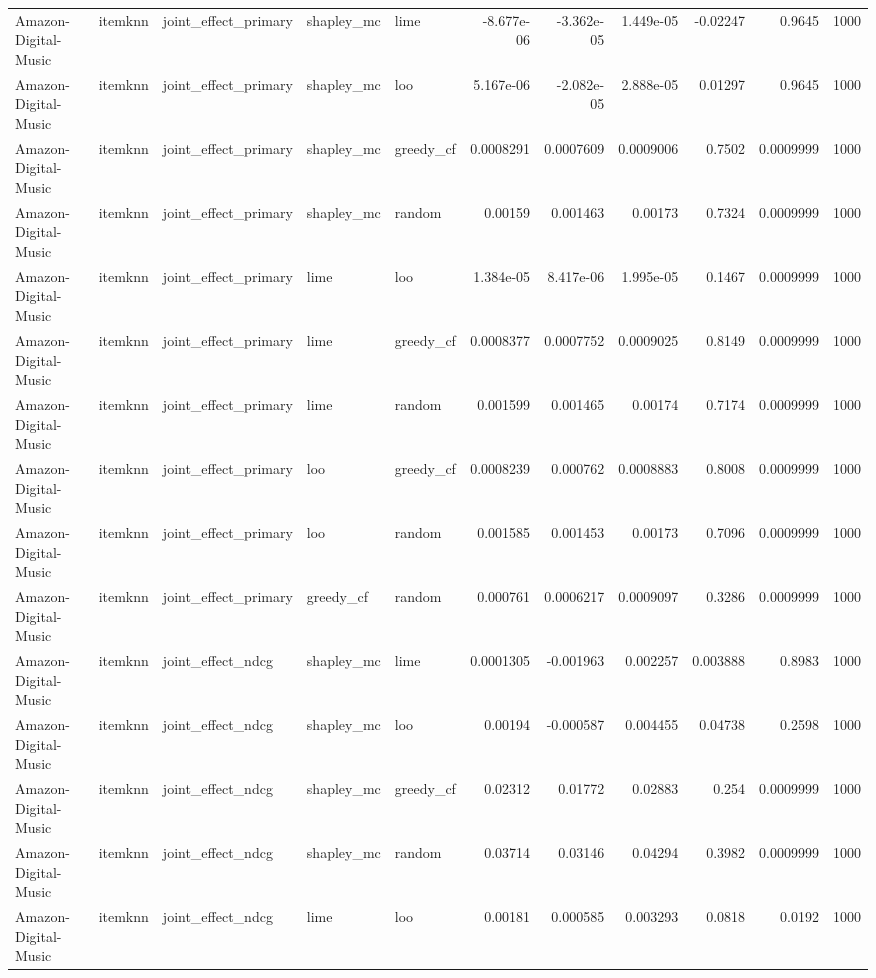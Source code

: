 \begin{table}[t]
\begin{tabular}{lllllrrrrrr}
Amazon-Digital-Music & itemknn & joint\_effect\_primary & shapley\_mc & lime & -8.677e-06 & -3.362e-05 & 1.449e-05 & -0.02247 & 0.9645 & 1000 \\
Amazon-Digital-Music & itemknn & joint\_effect\_primary & shapley\_mc & loo & 5.167e-06 & -2.082e-05 & 2.888e-05 & 0.01297 & 0.9645 & 1000 \\
Amazon-Digital-Music & itemknn & joint\_effect\_primary & shapley\_mc & greedy\_cf & 0.0008291 & 0.0007609 & 0.0009006 & 0.7502 & 0.0009999 & 1000 \\
Amazon-Digital-Music & itemknn & joint\_effect\_primary & shapley\_mc & random & 0.00159 & 0.001463 & 0.00173 & 0.7324 & 0.0009999 & 1000 \\
Amazon-Digital-Music & itemknn & joint\_effect\_primary & lime & loo & 1.384e-05 & 8.417e-06 & 1.995e-05 & 0.1467 & 0.0009999 & 1000 \\
Amazon-Digital-Music & itemknn & joint\_effect\_primary & lime & greedy\_cf & 0.0008377 & 0.0007752 & 0.0009025 & 0.8149 & 0.0009999 & 1000 \\
Amazon-Digital-Music & itemknn & joint\_effect\_primary & lime & random & 0.001599 & 0.001465 & 0.00174 & 0.7174 & 0.0009999 & 1000 \\
Amazon-Digital-Music & itemknn & joint\_effect\_primary & loo & greedy\_cf & 0.0008239 & 0.000762 & 0.0008883 & 0.8008 & 0.0009999 & 1000 \\
Amazon-Digital-Music & itemknn & joint\_effect\_primary & loo & random & 0.001585 & 0.001453 & 0.00173 & 0.7096 & 0.0009999 & 1000 \\
Amazon-Digital-Music & itemknn & joint\_effect\_primary & greedy\_cf & random & 0.000761 & 0.0006217 & 0.0009097 & 0.3286 & 0.0009999 & 1000 \\
Amazon-Digital-Music & itemknn & joint\_effect\_ndcg & shapley\_mc & lime & 0.0001305 & -0.001963 & 0.002257 & 0.003888 & 0.8983 & 1000 \\
Amazon-Digital-Music & itemknn & joint\_effect\_ndcg & shapley\_mc & loo & 0.00194 & -0.000587 & 0.004455 & 0.04738 & 0.2598 & 1000 \\
Amazon-Digital-Music & itemknn & joint\_effect\_ndcg & shapley\_mc & greedy\_cf & 0.02312 & 0.01772 & 0.02883 & 0.254 & 0.0009999 & 1000 \\
Amazon-Digital-Music & itemknn & joint\_effect\_ndcg & shapley\_mc & random & 0.03714 & 0.03146 & 0.04294 & 0.3982 & 0.0009999 & 1000 \\
Amazon-Digital-Music & itemknn & joint\_effect\_ndcg & lime & loo & 0.00181 & 0.000585 & 0.003293 & 0.0818 & 0.0192 & 1000 \\

\end{tabular}
\end{table}
